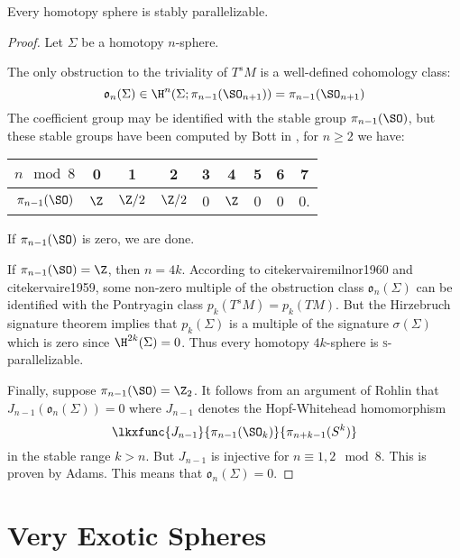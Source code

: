 \begin{theorem}\label{thm:kervaire-invariant-problem}
\end{theorem}

\begin{theorem}\label{thm:homotopy-sphere-stably-parallelizable}
	Every homotopy sphere is stably parallelizable.
\end{theorem}
\begin{proof}
	Let $\Sigma$ be a homotopy $n$-sphere.

	The only obstruction to the triviality of $T^sM$ is a well-defined cohomology class:
	\[
		\mathfrak{o}_n(\Sigma) \in \H^n(\Sigma; \pi_{n-1}(\SO_{n+1})) = \pi_{n-1}(\SO_{n+1})
	\]
	The coefficient group may be identified with the stable group $\pi_{n-1}(\SO)$, but these stable groups have been computed by Bott in \cite{bott1959stable}, for $n\geq 2$ we have:
	\begin{center}
		\begin{tabular}{c|cccccccc}
			\textrm{$n\mod 8$} & 0    & 1      & 2      & 3 & 4    & 5 & 6 & 7  \\
			\hline
			$\pi_{n-1}(\SO)$   & $\Z$ & $\Z/2$ & $\Z/2$ & 0 & $\Z$ & 0 & 0 & 0.
		\end{tabular}
	\end{center}
	If $\pi_{n-1}(\SO)$ is zero, we are done.

	If $\pi_{n-1}(\SO) = \Z$, then $n=4k$. According to cite{kervairemilnor1960} and cite{kervaire1959}, some non-zero multiple of the obstruction class $\mathfrak{o}_n(\Sigma)$ can be identified with the Pontryagin class $p_k(T^s M) = p_k(TM)$.  But the Hirzebruch signature theorem implies  that $p_k(\Sigma)$ is a multiple of the signature $\sigma(\Sigma)$ which is zero since $\H^{2k}(\Sigma)=0$. Thus every homotopy $4k$-sphere is \textsc{s}-parallelizable.

	Finally, suppose $\pi_{n-1}(\SO)= \Z_2$. It follows from an argument of Rohlin  that $J_{n-1}(\mathfrak{o}_n(\Sigma))=0$ where $J_{n-1}$ denotes the Hopf-Whitehead homomorphism
	\[
		\lkxfunc{J_{n-1}}{\pi_{n-1}(\SO_k)}{\pi_{n+k-1}(S^k)}
	\]
	in the stable range $k >n$. But $J_{n-1}$ is injective for $n\equiv 1, 2\mod 8$. This is proven by Adams.  This means that $\mathfrak{o}_n(\Sigma)=0$.
\end{proof}

\section{Very Exotic Spheres}

